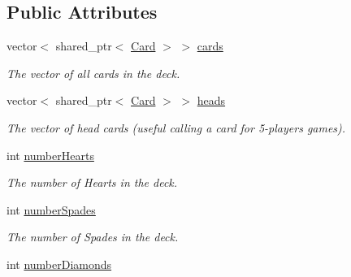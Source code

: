 \subsection*{Public Attributes}
\begin{DoxyCompactItemize}
\item 
\hypertarget{classDeck_a6b1a1cb4731888fe92e381dd74eb1e16}{vector$<$ shared\-\_\-ptr$<$ \hyperlink{classCard}{Card} $>$ $>$ \hyperlink{classDeck_a6b1a1cb4731888fe92e381dd74eb1e16}{cards}}\label{classDeck_a6b1a1cb4731888fe92e381dd74eb1e16}

\begin{DoxyCompactList}\small\item\em The vector of all cards in the deck. \end{DoxyCompactList}\item 
\hypertarget{classDeck_a25fb7d0855d89be0f4f9928900b39ebc}{vector$<$ shared\-\_\-ptr$<$ \hyperlink{classCard}{Card} $>$ $>$ \hyperlink{classDeck_a25fb7d0855d89be0f4f9928900b39ebc}{heads}}\label{classDeck_a25fb7d0855d89be0f4f9928900b39ebc}

\begin{DoxyCompactList}\small\item\em The vector of head cards (useful calling a card for 5-\/players games). \end{DoxyCompactList}\item 
\hypertarget{classDeck_ac42ed01da688a430609cac03c00b2a5a}{int \hyperlink{classDeck_ac42ed01da688a430609cac03c00b2a5a}{number\-Hearts}}\label{classDeck_ac42ed01da688a430609cac03c00b2a5a}

\begin{DoxyCompactList}\small\item\em The number of Hearts in the deck. \end{DoxyCompactList}\item 
\hypertarget{classDeck_a3f3e1163d62a3e6136d2a1104b93f80d}{int \hyperlink{classDeck_a3f3e1163d62a3e6136d2a1104b93f80d}{number\-Spades}}\label{classDeck_a3f3e1163d62a3e6136d2a1104b93f80d}

\begin{DoxyCompactList}\small\item\em The number of Spades in the deck. \end{DoxyCompactList}\item 
\hypertarget{classDeck_ac36c6f248cf951b54580d6eba0734e3b}{int \hyperlink{classDeck_ac36c6f248cf951b54580d6eba0734e3b}{number\-Diamonds}}\label{classDeck_ac36c6f248cf951b54580d6eba0734e3b}


\end{DoxyCompactItemize}
